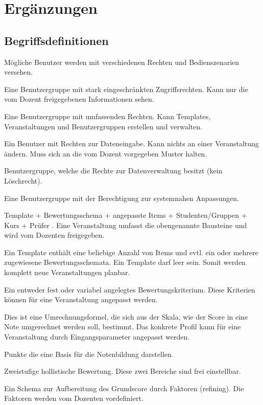 	
	\section{Ergänzungen}
		
	
	
 \begin{appendix}
  \section{Begriffsdefinitionen}
	\begin{description}
	\item[Benutzergruppen] Mögliche Benutzer werden mit verschiedenen Rechten und Bedienszenarien versehen.
	\item[Student] Eine Benutzergruppe mit stark eingeschränkten Zugriffsrechten. Kann nur die vom Dozent freigegebenen Informationen sehen.
	\item[Dozent] Eine Benutzergruppe mit umfassenden Rechten. Kann Templates, Veranstaltungen und Benutzergruppen erstellen und verwalten.
	\item[Prüfer] Ein Benutzer mit Rechten zur Dateneingabe. Kann nichts an einer Veranstaltung ändern. Muss sich an die vom Dozent vorgegeben Muster halten.
	\item[Sekretariat] Benutzergruppe, welche die Rechte zur Datenverwaltung besitzt (kein Löschrecht).
	\item[Administrator] Eine Benutzergruppe mit der Berechtigung zur systemnahen Anpassungen.
	\item[Veranstaltung] Template + Bewertungsschema + angepasste Items + Studenten/Gruppen + Kurs + Prüfer . Eine Veranstaltung umfasst die obengenannte Bausteine und wird vom Dozenten freigegeben. 
	\item[Template] Ein Template enthält eine beliebige Anzahl von Items und evtl. ein oder mehrere zugewiesene Bewertungsschemata. Ein Template darf leer sein. Somit werden komplett neue Veranstaltungen planbar.
	\item[Item] Ein entweder fest oder variabel angelegtes Bewertungskriterium. Diese Kriterien können für eine Veranstaltung angepasst werden.
	\item[{\parbox[t]{0.2\linewidth}{Notenkonvertierungsprofil \\ (S$_2$G)}}] {\parbox[t]{\linewidth}{ Dies ist eine Umrechnungsformel, die sich aus der Skala, wie der Score in eine Note umgerechnet werden soll, bestimmt. Das konkrete Profil kann für eine Veranstaltung durch Eingangsparameter angepasst werden.}}
	\item[Score] Punkte die eine Basis für die Notenbildung darstellen.
	\item[Grundscore (H$_2$)]  Zweistufige hollistische Bewertung. Diese zwei Bereiche sind frei einstellbar.
	\item[Score Refining (S$_2$R)]  Ein Schema zur Aufbereitung des Grundscore durch Faktoren (refining). Die Faktoren werden vom Dozenten vordefiniert.
	

\end{description}
\end{appendix}
